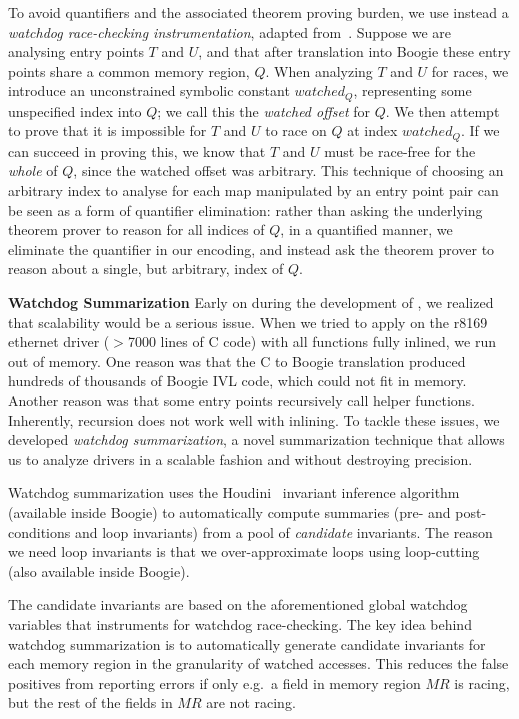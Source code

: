 To avoid quantifiers and the associated theorem proving burden, we use instead a \emph{watchdog race-checking instrumentation}, adapted from~\cite{bardsley2014engineering}.  Suppose we are analysing entry points $T$ and $U$, and that after translation into Boogie these entry points share a common memory region, $Q$.  When analyzing $T$ and $U$ for races, we introduce an unconstrained symbolic constant $\mathit{watched}_Q$, representing some unspecified index into $Q$; we call this the \emph{watched offset} for $Q$.  We then attempt to prove that it is impossible for $T$ and $U$ to race on $Q$ at index $\mathit{watched}_Q$.  If we can succeed in proving this, we know that $T$ and $U$ must be race-free for the \emph{whole} of $Q$, since the watched offset was arbitrary.  This technique of choosing an arbitrary index to analyse for each map manipulated by an entry point pair can be seen as a form of quantifier elimination: rather than asking the underlying theorem prover to reason for all indices of $Q$, in a quantified manner, we eliminate the quantifier in our encoding, and instead ask the theorem prover to reason about a single, but arbitrary, index of $Q$.

\medskip\noindent\textbf{Watchdog Summarization }
%
Early on during the development of \whoop, we realized that scalability would be a serious issue. When we tried to apply \whoop on the r8169 ethernet driver ($>$7000 lines of C code) with all functions fully inlined, we run out of memory. One reason was that the C to Boogie translation produced hundreds of thousands of Boogie IVL code, which could not fit in memory. Another reason was that some entry points recursively call helper functions. Inherently, recursion does not work well with inlining. To tackle these issues, we developed \emph{watchdog summarization}, a novel summarization technique that allows us to analyze drivers in a scalable fashion and without destroying precision.

Watchdog summarization uses the Houdini~\cite{flanagan2001houdini} invariant inference algorithm (available inside Boogie) to automatically compute summaries (pre- and post-conditions and loop invariants) from a pool of \emph{candidate} invariants. The reason we need loop invariants is that we over-approximate loops using loop-cutting (also available inside Boogie).

The candidate invariants are based on the aforementioned global watchdog variables that \whoop instruments for watchdog race-checking. The key idea behind watchdog summarization is to automatically generate candidate invariants for each memory region in the granularity of watched accesses. This reduces the false positives from reporting errors if only e.g.\ a field in memory region $\mathit{MR}$ is racing, but the rest of the fields in $\mathit{MR}$ are not racing.

